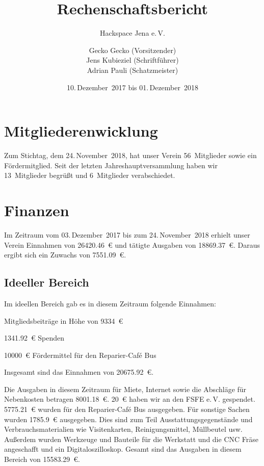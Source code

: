 \documentclass[ngerman]{scrartcl}
\title{Rechenschaftsbericht}
\subtitle{Hackspace Jena e.\,V.}
\author{%
	Gecko Gecko (Vorsitzender)\\
	Jens Kubieziel (Schriftführer)\\
	Adrian Pauli (Schatzmeister)
}
\date{10.\,Dezember~2017 bis 01.\,Dezember~2018}
\begin{document}
\maketitle{}
\newpage

\tableofcontents{}

\newpage{}

\section{Mitgliederenwicklung}

Zum Stichtag, dem 24.\,November~2018, hat unser Verein 56~Mitglieder sowie ein Fördermitglied.
Seit der letzten Jahreshauptversammlung haben wir 13~Mitglieder begrüßt und 6~Mitglieder verabschiedet.

\section{Finanzen}

Im Zeitraum vom 03.\,Dezember~2017 bis zum 24.\,November~2018 erhielt unser Verein Einnahmen von \num{26420,46}~\euro{} und tätigte Ausgaben von \num{18869,37}~\euro{}.
Daraus ergibt sich ein Zuwachs von \num{7551,09}~\euro{}.


\subsection{Ideeller Bereich}
\label{sec:ideeller_bereich}

Im ideellen Bereich gab es in diesem Zeitraum folgende Einnahmen:
\begin{compactitem}
\item Mitgliedsbeiträge in Höhe von \num{9334}~\euro{}
\item \num{1341,92}~\euro{} Spenden
\item \num{10000}~\euro{} Fördermittel für den Reparier-Café Bus
\end{compactitem}
Insgesamt sind das Einnahmen von \num{20675,92}~\euro{}.

Die Ausgaben in diesem Zeitraum für Miete, Internet sowie die Abschläge für Nebenkosten betragen \num{8001,18}~\euro{}.
\num{20}~\euro{} haben wir an den FSFE e.\,V. gespendet.
\num{5775,21}~\euro{} wurden für den Reparier-Café Bus ausgegeben.
Für sonstige Sachen wurden \num{1785,9}~\euro{} ausgegeben.
Dies sind zum Teil Ausstattungsgegenstände und Verbrauchsmaterialien wie Visitenkarten, Reinigungsmittel, Müllbeutel usw.
Außerdem wurden Werkzeuge und Bauteile für die Werkstatt und die CNC Fräse angeschafft und ein Digitaloszilloskop.
Gesamt sind das Ausgaben in diesem Bereich von \num{15583,29}~\euro{}.
\end{document}

